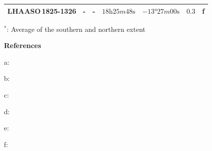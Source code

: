 \begin{table}[h!]
{\begin{threeparttable}
\begin{tabular}{rllllll}
        \textbf{LHAASO\,1825-1326} & - & - & $18\si{\hour}25\si{m}48\si{\second}$ & $-\ang{13}27\si{m}00\si{\second}$ & $0.3$ & f \\
        \bottomrule
    \end{tabular}
    \begin{tablenotes}
	\item $^*$: Average of the southern and northern extent 
	\item \textbf{References}
	\item a: \citep{2019A&A...621A.116H}
	\item b: \citep{2020ApJS..247...33A}
	\item c: \citep{2020A&A...640A..76P}
	\item d: \citep{2020ApJ...905...76A}
	\item e: \citep{PhysRevLett.124.021102}
    \item f: \citep{2021Natur.594...33C}
    \end{tablenotes}
    \end{threeparttable}
    }
    \label{tab:chapter1_1825_parameters}
\end{table}

